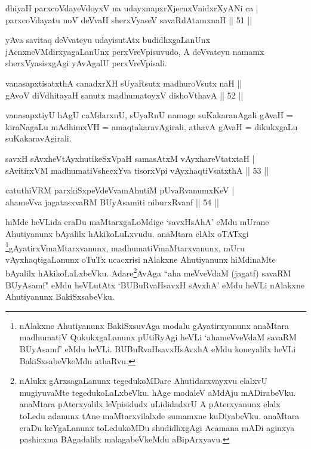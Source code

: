 
\begin{shl}
dhiyaH parxcoVdayeVdoyxV na udayxnapxrXjecnxVnidxrXyANi ca | \\
parxcoVdayatu noV deVvaH sherxVyaseV savaRdA\s \s tamxnaH \hfill|| 51 || 
\end{shl}

\begin{artha}
yAva savitaq deVvateyu udayisutAtx budidhxgaLanUnx 
jAcnxneVMdirxyagaLanUnx perxVreVpisuvudo, A deVvateyu namamx 
sherxVyasisxgAgi yAvAgalU perxVreVpisali.
\end{artha}


\begin{shl}
vanasapxtisatxthA canadxrXH sUyaRsutx madhuroV\s sutx naH || \\
gAvoV diVdhitayaH sanutx madhumatoyxV dishoV\s thavA  \hfill|| 52 || 
\end{shl}

\begin{artha}
vanasapxtiyU hAgU caMdarxnU, sUyaRnU namage suKakaranAgali gAvaH = 
kiraNagaLu mAdhimxVH = amaqtakaravAgirali, athavA gAvaH = dikukxgaLu 
suKakaravAgirali.
\end{artha}

\begin{shl}
savxH sAvxheVtAyxhutikeSxVpaH samasAtxM vAyxhareVtatxtaH | \\
sAvitirxVM madhumatiVshecxYva tisorxV\s pi vAyxhaqtiVsatxthA \hfill|| 53 || 
\end{shl}

\begin{shl}
catuthiVRM parxkiSxpeVdeVvamAhutiM pUvaRvanumxKeV | \\
ahameVva jagatasxvaRM BUyAsamiti niburxRvanf \hfill|| 54 || 
\end{shl}

\begin{artha}
hiMde heVLida eraDu maMtarxgaLoMdige `savxHsAhA' eMdu mUrane 
Ahutiyanunx bAyalilx hAkikoLuLxvudu. anaMtara elAlx oTATxgi 
\footnote[1]{nAlakxne Ahutiyanunx BakiSxsuvAga modalu gAyatirxyanunx 
anaMtara madhumatiV QukukxgaLanunx pUtiRyAgi heVLi `ahameVveVdaM 
savaRM BUyAsamf' eMdu heVLi. BUBuRvaHsavxHsAvxhA eMdu koneyalilx heVLi 
BakiSxsabeVkeMdu athaRvu.}gAyatirxVmaMtarxvanunx, madhumatiVmaMtarxvanunx, mUru 
vAyxhaqtigaLanunx oTuTx ucacxrisi nAlakxne Ahutiyanunx hiMdinaMte 
bAyalilx hAkikoLaLxbeVku. Adare\footnote[2]{nAlukx gArxsagaLanunx 
tegedukoMDare Ahutidarxvayxvu elalxvU mugiyuvaMte tegedukoLaLxbeVku. 
hAge modaleV aMdAju mADirabeVku. anaMtara pAterxyalilx leVpisidudx 
uLididadxrU A pAterxyanunx elalx toLedu adanunx tAne maMtarxvilalxde 
sumamxne kuDiyabeVku. anaMtara eraDu keYgaLanunx toLedukoMDu 
shudidhxgAgi Acamana mADi aginxya pashicxma BAgadalilx malagabeVkeMdu 
aBipArxyavu.}AvAga ``aha meVveVdaM 
(jagatf) savaRM BUyAsamf" eMdu heVLutAtx `BUBuRvaHsavxH sAvxhA' eMdu 
heVLi nAlakxne Ahutiyanunx BakiSxsabeVku.
\end{artha}

